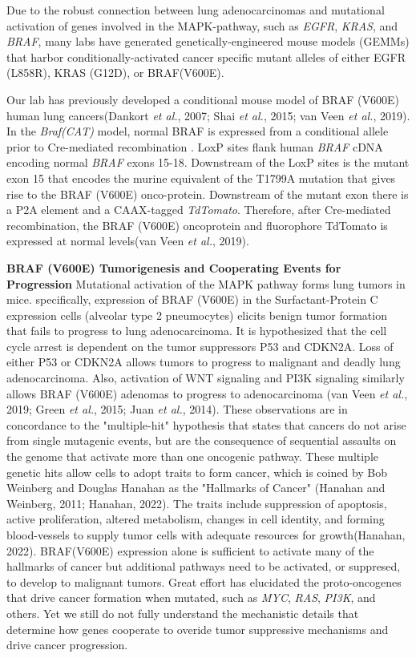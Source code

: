 Due to the robust connection between lung adenocarcinomas and mutational activation of genes involved in the MAPK-pathway, such as \emph{EGFR}, \emph{KRAS}, and \emph{BRAF}, many labs have generated genetically-engineered mouse models (GEMMs) that harbor conditionally-activated cancer specific mutant alleles of either EGFR (L858R), KRAS (G12D), or BRAF(V600E).

Our lab has previously developed a conditional mouse model of BRAF (V600E) human lung cancers(Dankort \emph{et al.}, 2007; Shai \emph{et al.}, 2015; van Veen \emph{et al.}, 2019). In the \emph{Braf(CAT)} model, normal BRAF is expressed from a conditional allele prior to Cre-mediated recombination . LoxP sites flank human \emph{BRAF} cDNA encoding normal \emph{BRAF} exons 15-18. Downstream of the LoxP sites is the mutant exon 15 that encodes the murine equivalent of the T1799A mutation that gives rise to the BRAF (V600E) onco-protein. Downstream of the mutant exon there is a P2A element and a CAAX-tagged \emph{TdTomato}. Therefore, after Cre-mediated recombination, the BRAF (V600E) oncoprotein and fluorophore TdTomato is expressed at normal levels(van Veen \emph{et al.}, 2019).

\textbf{BRAF (V600E) Tumorigenesis and Cooperating Events for Progression} Mutational activation of the MAPK pathway forms lung tumors in mice. specifically, expression of BRAF (V600E) in the Surfactant-Protein C expression cells (alveolar type 2 pneumocytes) elicits benign tumor formation that fails to progress to lung adenocarcinoma. It is hypothesized that the cell cycle arrest is dependent on the tumor suppressors P53 and CDKN2A. Loss of either P53 or CDKN2A allows tumors to progress to malignant and deadly lung adenocarcinoma. Also, activation of WNT signaling and PI3K signaling similarly allows BRAF (V600E) adenomas to progress to adenocarcinoma (van Veen \emph{et al.}, 2019; Green \emph{et al.}, 2015; Juan \emph{et al.}, 2014). These observations are in concordance to the "multiple-hit" hypothesis that states that cancers do not arise from single mutagenic events, but are the consequence of sequential assaults on the genome that activate more than one oncogenic pathway. These multiple genetic hits allow cells to adopt traits to form cancer, which is coined by Bob Weinberg and Douglas Hanahan as the "Hallmarks of Cancer" (Hanahan and Weinberg, 2011; Hanahan, 2022). The traits include suppression of apoptosis, active proliferation, altered metabolism, changes in cell identity, and forming blood-vessels to supply tumor cells with adequate resources for growth(Hanahan, 2022). BRAF(V600E) expression alone is sufficient to activate many of the hallmarks of cancer but additional pathways need to be activated, or suppresed, to develop to malignant tumors. Great effort has elucidated the proto-oncogenes that drive cancer formation when mutated, such as \emph{MYC}, \emph{RAS}, \emph{PI3K}, and others. Yet we still do not fully understand the mechanistic details that determine how genes cooperate to overide tumor suppressive mechanisms and drive cancer progression.

